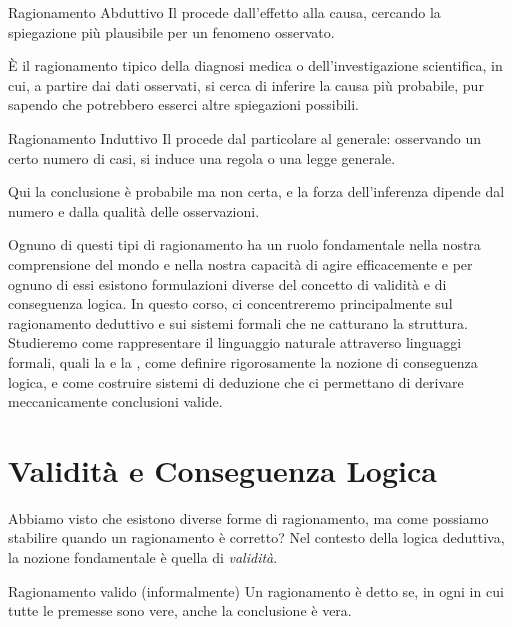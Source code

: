 \begin{definition}{Ragionamento Abduttivo}
  Il  procede dall'effetto alla causa, cercando la spiegazione più plausibile per un fenomeno osservato.
\end{definition}

È il ragionamento tipico della diagnosi medica o dell'investigazione scientifica, in cui, a partire dai dati osservati, si cerca di inferire la causa più probabile, pur sapendo che potrebbero esserci altre spiegazioni possibili.

\begin{definition}{Ragionamento Induttivo}
  Il  procede dal particolare al generale: osservando un certo numero di casi, si induce una regola o una legge generale.
\end{definition}
Qui la conclusione è probabile ma non certa, e la forza dell'inferenza dipende dal numero e dalla qualità delle osservazioni.

Ognuno di questi tipi di ragionamento ha un ruolo fondamentale nella nostra comprensione del mondo e nella nostra capacità di agire efficacemente e per ognuno di essi esistono formulazioni diverse del concetto di validità e di conseguenza logica.
In questo corso, ci concentreremo principalmente sul ragionamento deduttivo e sui sistemi formali che ne catturano la struttura. Studieremo come rappresentare il linguaggio naturale attraverso linguaggi formali, quali la  e la , come definire rigorosamente la nozione di conseguenza logica, e come costruire sistemi di deduzione che ci permettano di derivare meccanicamente conclusioni valide.

\section{Validità e Conseguenza Logica}

Abbiamo visto che esistono diverse forme di ragionamento, ma come possiamo stabilire quando un ragionamento è corretto?
Nel contesto della logica deduttiva, la nozione fondamentale è quella di \textit{validità}.

\begin{definition}{Ragionamento valido (informalmente)}
  Un ragionamento è detto  se, in ogni  in cui tutte le premesse sono vere, anche la conclusione è vera.
\end{definition}

